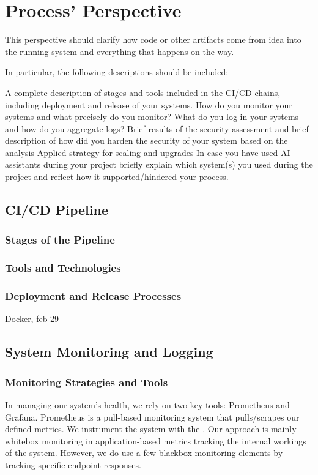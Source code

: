 \section{Process' Perspective}
This perspective should clarify how code or other artifacts come from idea into the running system and everything that happens on the way.

In particular, the following descriptions should be included:

A complete description of stages and tools included in the CI/CD chains, including deployment and release of your systems.
How do you monitor your systems and what precisely do you monitor?
What do you log in your systems and how do you aggregate logs?
Brief results of the security assessment and brief description of how did you harden the security of your system based on the analysis
Applied strategy for scaling and upgrades
In case you have used AI-assistants during your project briefly explain which system(s) you used during the project and reflect how it supported/hindered your process.

\subsection{CI/CD Pipeline}
\subsubsection*{Stages of the Pipeline}
\subsubsection*{Tools and Technologies}
\subsubsection*{Deployment and Release Processes}
Docker, feb 29
\subsection{System Monitoring and Logging}
\subsubsection*{Monitoring Strategies and Tools}
In managing our system's health, we rely on two key tools: Prometheus and Grafana. Prometheus is a pull-based monitoring system that pulls/scrapes our defined metrics. We instrument the system with the . Our approach is mainly whitebox monitoring in application-based metrics tracking the internal workings of the system. However, we do use a few blackbox monitoring elements by tracking specific endpoint responses.\\

